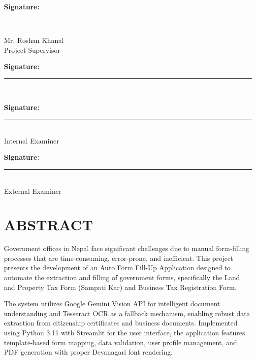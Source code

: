 \documentclass[12pt]{report}
\begin{document}
\noindent
\begin{minipage}{0.45\textwidth}
\textbf{Signature:} \rule{4cm}{0.4pt} \\
Mr. Roshan Khanal \\
Project Supervisor
\end{minipage}
\hfill
\begin{minipage}{0.45\textwidth}
\textbf{Signature:} \rule{4cm}{0.4pt} \\

\end{minipage}

\vspace{1.5cm}

\noindent
\begin{minipage}{0.45\textwidth}
\textbf{Signature:} \rule{4cm}{0.4pt} \\
Internal Examiner
\end{minipage}
\hfill
\begin{minipage}{0.45\textwidth}
\textbf{Signature:} \rule{4cm}{0.4pt} \\
External Examiner
\end{minipage}




\newpage
\chapter*{ABSTRACT}

Government offices in Nepal face significant challenges due to manual form-filling processes that are time-consuming, error-prone, and inefficient. This project presents the development of an Auto Form Fill-Up Application designed to automate the extraction and filling of government forms, specifically the Land and Property Tax Form (Sampati Kar) and Business Tax Registration Form. 

The system utilizes Google Gemini Vision API for intelligent document understanding and Tesseract OCR as a fallback mechanism, enabling robust data extraction from citizenship certificates and business documents. Implemented using Python 3.11 with Streamlit for the user interface, the application features template-based form mapping, data validation, user profile management, and PDF generation with proper Devanagari font rendering.
\end{document}
